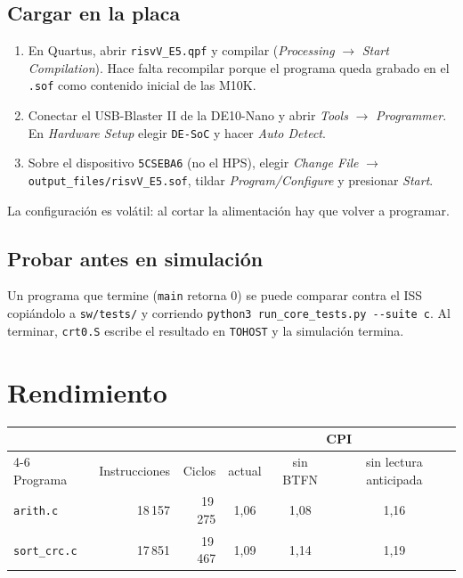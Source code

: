 \documentclass[11pt,a4paper]{article}
\newcommand{\code}[1]{\texttt{#1}}
\begin{document}
\subsection{Cargar en la placa}

\begin{enumerate}
\item En Quartus, abrir \code{risvV\_E5.qpf} y compilar (\emph{Processing} $\to$ \emph{Start Compilation}). Hace falta recompilar porque el programa queda grabado en el \code{.sof} como contenido inicial de las M10K.
\item Conectar el USB-Blaster II de la DE10-Nano y abrir \emph{Tools} $\to$ \emph{Programmer}. En \emph{Hardware Setup} elegir \code{DE-SoC} y hacer \emph{Auto Detect}.
\item Sobre el dispositivo \code{5CSEBA6} (no el HPS), elegir \emph{Change File} $\to$ \code{output\_files/risvV\_E5.sof}, tildar \emph{Program/Configure} y presionar \emph{Start}.
\end{enumerate}

La configuración es volátil: al cortar la alimentación hay que volver a programar.

\subsection{Probar antes en simulación}

Un programa que termine (\code{main} retorna 0) se puede comparar contra el ISS copiándolo a \code{sw/tests/} y corriendo \lstinline{python3 run_core_tests.py --suite c}. Al terminar, \code{crt0.S} escribe el resultado en \code{TOHOST} y la simulación termina.

\section{Rendimiento}

\begin{center}
\begin{tabular}{lrrccc}
\toprule
 & & & \multicolumn{3}{c}{CPI} \\
\cmidrule(lr){4-6}
Programa & Instrucciones & Ciclos & actual & sin BTFN & sin lectura anticipada \\
\midrule
\code{arith.c} & 18\,157 & 19\,275 & 1,06 & 1,08 & 1,16 \\
\code{sort\_crc.c} & 17\,851 & 19\,467 & 1,09 & 1,14 & 1,19 \\
\bottomrule
\end{tabular}
\end{center}
\end{document}
